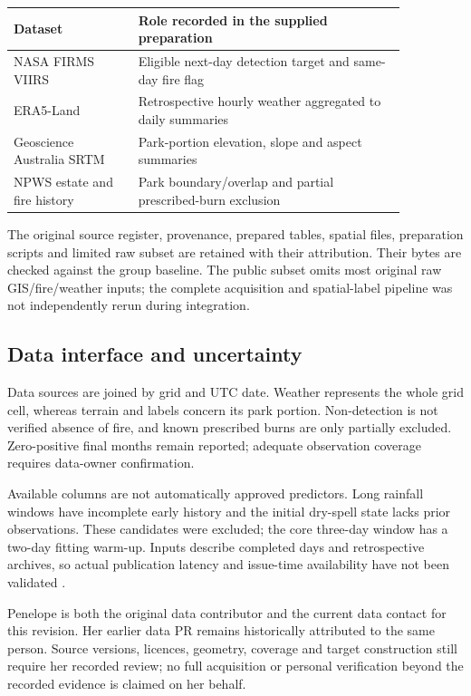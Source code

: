 \begin{center}\small\setlength{\tabcolsep}{3pt}
\begin{tabular}{p{0.275\linewidth}p{0.585\linewidth}}
\hline
Dataset & Role recorded in the supplied preparation \\ \hline
NASA FIRMS VIIRS & Eligible next-day detection target and same-day fire flag \\
ERA5-Land & Retrospective hourly weather aggregated to daily summaries \\
Geoscience Australia SRTM & Park-portion elevation, slope and aspect summaries \\
NPWS estate and fire history & Park boundary/overlap and partial prescribed-burn exclusion \\
\hline\end{tabular}\end{center}

The original source register, provenance, prepared tables, spatial files, preparation scripts and limited raw subset are retained with their attribution. Their bytes are checked against the group baseline. The public subset omits most original raw GIS/fire/weather inputs; the complete acquisition and spatial-label pipeline was not independently rerun during integration.

\subsection*{Data interface and uncertainty}

Data sources are joined by grid and UTC date. Weather represents the whole grid cell, whereas terrain and labels concern its park portion. Non-detection is not verified absence of fire, and known prescribed burns are only partially excluded. Zero-positive final months remain reported; adequate observation coverage requires data-owner confirmation.

Available columns are not automatically approved predictors. Long rainfall windows have incomplete early history and the initial dry-spell state lacks prior observations. These candidates were excluded; the core three-day window has a two-day fitting warm-up. Inputs describe completed days and retrospective archives, so actual publication latency and issue-time availability have not been validated \cite{mlERA5Land}.

Penelope is both the original data contributor and the current data contact for this revision. Her earlier data PR remains historically attributed to the same person. Source versions, licences, geometry, coverage and target construction still require her recorded review; no full acquisition or personal verification beyond the recorded evidence is claimed on her behalf.


